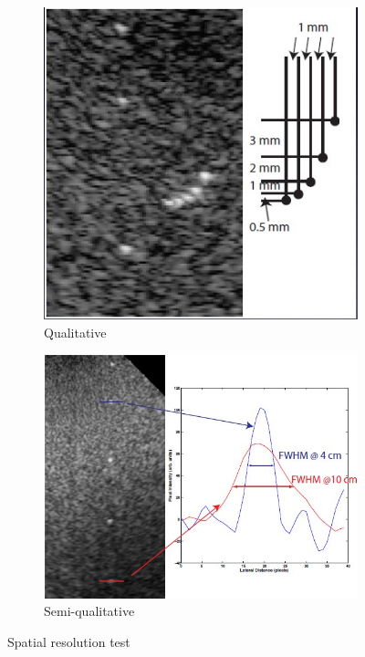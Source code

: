 \documentclass[12pt]{article}
\begin{document}
\begin{figure}[h!]
  \centering
  \begin{subfigure}[b]{0.35\linewidth}
    \centering
    \includegraphics[width=1\linewidth]{q.jpg}
    \caption{Qualitative}
  \end{subfigure}
  \begin{subfigure}[b]{0.6\linewidth}
    \centering
    \includegraphics[width=1\linewidth]{sq.jpg}
    \caption{Semi-qualitative}
  \end{subfigure}
  \caption{Spatial resolution test}
  \label{fig:Projectional Radiography}
\end{figure}
\end{document}

